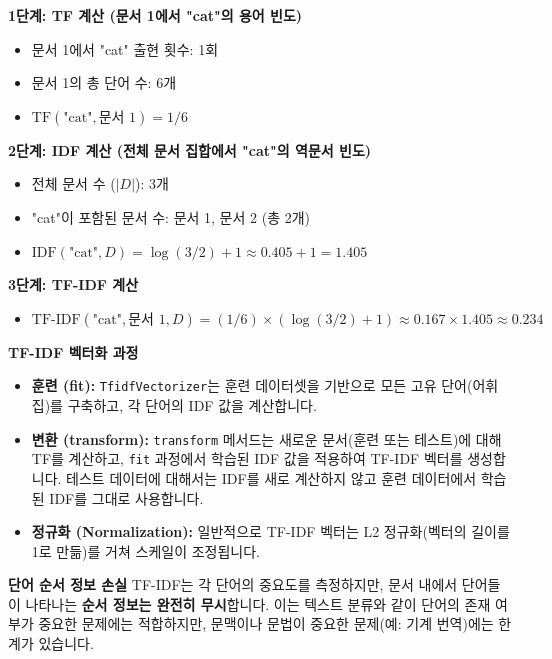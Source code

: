 \documentclass[11pt,a4paper]{article}
\theoremstyle{definition}
\begin{document}
\begin{enumerate}
\begin{examplebox}
    \textbf{1단계: TF 계산 (문서 1에서 "cat"의 용어 빈도)}
    \begin{itemize}
        \item 문서 1에서 "cat" 출현 횟수: 1회
        \item 문서 1의 총 단어 수: 6개
        \item $\text{TF}(\text{"cat"}, \text{문서 1}) = 1/6$
    \end{itemize}

    \textbf{2단계: IDF 계산 (전체 문서 집합에서 "cat"의 역문서 빈도)}
    \begin{itemize}
        \item 전체 문서 수 ($|D|$): 3개
        \item "cat"이 포함된 문서 수: 문서 1, 문서 2 (총 2개)
        \item $\text{IDF}(\text{"cat"}, D) = \log(3/2) + 1 \approx 0.405 + 1 = 1.405$
    \end{itemize}

    \textbf{3단계: TF-IDF 계산}
    \begin{itemize}
        \item $\text{TF-IDF}(\text{"cat"}, \text{문서 1}, D) = (1/6) \times (\log(3/2) + 1) \approx 0.167 \times 1.405 \approx 0.234$
    \end{itemize}
    \end{examplebox}

    \begin{tipbox}
    \textbf{TF-IDF 벡터화 과정}
    \begin{itemize}
        \item \textbf{훈련 (fit):} \texttt{TfidfVectorizer}는 훈련 데이터셋을 기반으로 모든 고유 단어(어휘집)를 구축하고, 각 단어의 IDF 값을 계산합니다.
        \item \textbf{변환 (transform):} \texttt{transform} 메서드는 새로운 문서(훈련 또는 테스트)에 대해 TF를 계산하고, \texttt{fit} 과정에서 학습된 IDF 값을 적용하여 TF-IDF 벡터를 생성합니다. 테스트 데이터에 대해서는 IDF를 새로 계산하지 않고 훈련 데이터에서 학습된 IDF를 그대로 사용합니다.
        \item \textbf{정규화 (Normalization):} 일반적으로 TF-IDF 벡터는 L2 정규화(벡터의 길이를 1로 만듦)를 거쳐 스케일이 조정됩니다.
    \end{itemize}
    \end{tipbox}

    \begin{cautionbox}
    \textbf{단어 순서 정보 손실}
    TF-IDF는 각 단어의 중요도를 측정하지만, 문서 내에서 단어들이 나타나는 \textbf{순서 정보는 완전히 무시}합니다. 이는 텍스트 분류와 같이 단어의 존재 여부가 중요한 문제에는 적합하지만, 문맥이나 문법이 중요한 문제(예: 기계 번역)에는 한계가 있습니다.
    \end{cautionbox}
\end{enumerate}
\end{document}
